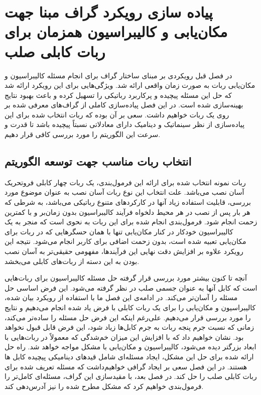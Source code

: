 \chapter{پیاده سازی رویکرد گراف مبنا جهت مکان‌یابی و کالیبراسیون همزمان برای ربات کابلی صلب}

در فصل قبل رویکردی بر مبنای ساختار گراف برای انجام مسئله کالیبراسیون و مکان‌یابی ربات به صورت زمان واقعی ارائه شد. ویژگی‌هایی برای این رویکرد ارائه شد که حل این مسئله پیچیده و پرکاربرد رباتیکی را تسهیل کرده و باعث بهبود نتایج بهینه‌سازی شده است. در این فصل پیاده‌سازی کاملی از گراف‌های معرفی شده بر روی یک ربات خواهیم داشت. سعی بر آن بوده که ربات انتخاب شده برای این پیاده‌سازی از نظر سینماتیک و دینامیک دارای معادلاتی نسبتاً پیچیده باشد تا قدرت و سرعت این الگوریتم را مورد بررسی کافی قرار دهیم.


\section{انتخاب ربات مناسب جهت توسعه الگوریتم}

ربات نمونه انتخاب شده برای ارائه این فرمول‌بندی، یک ربات چهار کابلی فروتحریک آسان نصب می‌باشد. علت انتخاب این نوع ربات آسان نصب به عنوان موضوع مورد بررسی، قابلیت استفاده زیاد آنها در کارکردهای متنوع رباتیکی می‌باشد، به شرطی که هر بار پس از نصب در هر محیط دلخواه فرآیند کالیبراسیون بدون زمان‌بر و با کمترین زحمت انجام شود. فرمول‌بندی انجام شده برای این ربات به نحوی است که منجر به یک کالیبراسیون خودکار در کنار مکان‌یابی تنها با همان حسگرهایی که در ربات برای مکان‌یابی تعبیه شده است، بدون زحمت اضافی برای کاربر انجام می‌شود. نتیجه این رویکرد علاوه بر افزایش دقت نهایی این فرآیندها، مفهومی حقیقی‌تر به آسان نصب بودن به این دسته از ربات‌های کابلی می‌بخشد.

آنچه تا کنون بیشتر مورد بررسی قرار گرفته حل مسئله کالیبراسیون برای ربات‌هایی است که کابل آنها به عنوان جسمی صلب در نظر گرفته می‌شود. این فرض اساسی حل مسئله را آسان‌تر می‌کند. در ادامه‌ی این فصل ما با استفاده از رویکرد بیان شده، کالیبراسیون و مکان‌یابی را برای یک ربات کابلی با فرض یاد شده انجام می‌دهیم و نتایج را مورد بررسی قرار می‌دهیم. علی‌رغم اینکه این فرض حل مسئله را ساده‌تر می‌کند، زمانی که نسبت جرم پنجه ربات به جرم کابل‌ها زیاد شود، این فرض قابل قبول نخواهد بود. نشان خواهیم داد که با افزایش این میزان خم‌شدگی که معمولاً در ربات‌هایی با ابعاد بزرگتر دیده می‌شود، کالیبراسیون و مکان‌یابی با مشکل مواجه خواهد شد. راه حل ارائه شده برای حل این مشکل، ایجاد مسئله‌ای شامل قیدهای دینامیکی پیچیده کابل ها هستند. در این فصل سعی بر ایجاد گرافی خواهیم‌داشت که مسئله تعریف شده برای ربات کابلی صلب را حل کند. در فصل بعد، با مقید‌سازی این گراف، مسئله‌ای کامل‌تر  را فرمول‌بندی خواهیم کرد که مشکل مطرح شده را نیز آدرس‌دهی کند.


